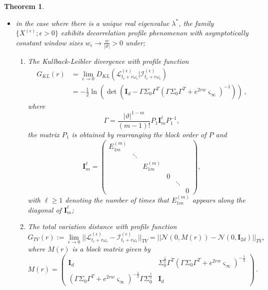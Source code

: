 \documentclass[10pt,a4paper]{amsart}
\newtheorem{theorem}{Theorem}
\begin{document}
\begin{theorem}
\begin{itemize}
	\item[ii)] in the case where there is a unique real eigenvalue $\lambda^*$, the family $\{X^{(\epsilon)}; \epsilon>0\}$ exhibits decorrelation profile phenomenon with  asymptotically constant window sizes $w_\epsilon\to \frac{w}{|\vartheta|}>0$ under; 
	\begin{enumerate}
		\item[a)] The Kullback-Leibler divergence with profile function
		\[
		\begin{split}
			G_{KL}(r) &= \lim_{\epsilon\to0}D_{KL}( \mathcal{L}^{(\epsilon)}_{t_\epsilon+r\omega_{\epsilon}} \Big|  \mathcal{I}^{(\epsilon)}_{t_\epsilon+r\omega_{\epsilon}} )  \\
			& =   -\frac{1}{2}\ln\left(\det\left( \mathbf{I}_d- \Gamma\Sigma_0\Gamma^T\left(\Gamma\Sigma_0\Gamma^T+ e^{2rw}\varsigma_{\infty} \right)^{-1}\right) \right)\,,
		\end{split}
		\]
		where 
		\[
		\Gamma=\frac{|\vartheta|^{1-m}}{(m-1)!} P_1\mathbf{I}^{\ell}_mP_1^{-1}, 
		\] 
		the matrix $P_1$ is obtained by rearranging the block order of $P$ and 
		\[
		\mathbf{I}^{\ell}_m=\begin{pmatrix}
			E_{1m}^{(m)}& & & & &\\ 
			&\ddots & & & &\\
			& &E_{1m}^{(m)} & & &\\
			& & & 0& & \\
			& & & &\ddots & \\
			& & & & & 0
		\end{pmatrix},
		\]
		with $\ell\geq 1$ denoting the number of times that $E_{1m}^{(m)}$ appears along the diagonal of $\mathbf{I}^{\ell}_m$;
		\item[b)] The total variation distance with profile function
		$$G_{TV}(r):=\lim_{\epsilon\to0}||\mathcal{L}^{(\epsilon)}_{t_\epsilon+r\omega_{\epsilon}}-\mathcal{I}^{(\epsilon)}_{t_\epsilon+r\omega_{\epsilon}}||_{TV} = ||\mathcal{N}(0, M(r) )-\mathcal{N}(0,\mathbf{I}_{2d} )||_{TV}, $$ 
		where $M(r)$ is a block matrix given by 
		\[
		M(r)=\begin{pmatrix}
			\mathbf{I}_d &  \Sigma_0^{\frac{1}{2}} \Gamma^T  ( \Gamma \Sigma_0 \Gamma^T + e^{2r w} \varsigma_{\infty} )^{-\frac{1}{2}} 
			\\ ( \Gamma \Sigma_0 \Gamma^T + e^{2rw} \varsigma_{\infty} )^{-\frac{1}{2}} \Gamma \Sigma_0^{\frac{1}{2}} & \mathbf{I}_d  \end{pmatrix}\,.
		\]
	\end{enumerate} 
\end{itemize}

\end{theorem}
\end{document}

